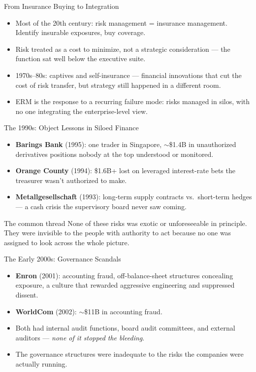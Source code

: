 \documentclass[11pt, aspectratio=169]{beamer}
\begin{document}
\begin{frame}{From Insurance Buying to Integration}
\begin{itemize}
  \item Most of the 20th century: risk management = \alert{insurance management}. Identify insurable exposures, buy coverage.
  \item Risk treated as a cost to minimize, not a strategic consideration --- the function sat well below the executive suite.
  \item 1970s--80s: captives and self-insurance --- financial innovations that cut the cost of risk transfer, but strategy still happened in a different room.
  \item ERM is the response to a recurring failure mode: risks managed in \alert{silos}, with no one integrating the enterprise-level view.
\end{itemize}
\end{frame}

\begin{frame}{The 1990s: Object Lessons in Siloed Finance}
\begin{itemize}
  \item \textbf{Barings Bank} (1995): one trader in Singapore, $\sim$\$1.4B in unauthorized derivatives positions nobody at the top understood or monitored.
  \item \textbf{Orange County} (1994): \$1.6B+ lost on leveraged interest-rate bets the treasurer wasn't authorized to make.
  \item \textbf{Metallgesellschaft} (1993): long-term supply contracts vs.\ short-term hedges --- a cash crisis the supervisory board never saw coming.
\end{itemize}
\medskip
\begin{block}{The common thread}
None of these risks was exotic or unforeseeable in principle. They were \alert{invisible to the people with authority to act} because no one was assigned to look across the whole picture.
\end{block}
\end{frame}

\begin{frame}{The Early 2000s: Governance Scandals}
\begin{itemize}
  \item \textbf{Enron} (2001): accounting fraud, off-balance-sheet structures concealing exposure, a culture that rewarded aggressive engineering and suppressed dissent.
  \item \textbf{WorldCom} (2002): $\sim$\$11B in accounting fraud.
  \item Both had internal audit functions, board audit committees, and external auditors --- \emph{none of it stopped the bleeding}.
  \item The governance structures were inadequate to the risks the companies were actually running.
\end{itemize}
\end{frame}
\end{document}
